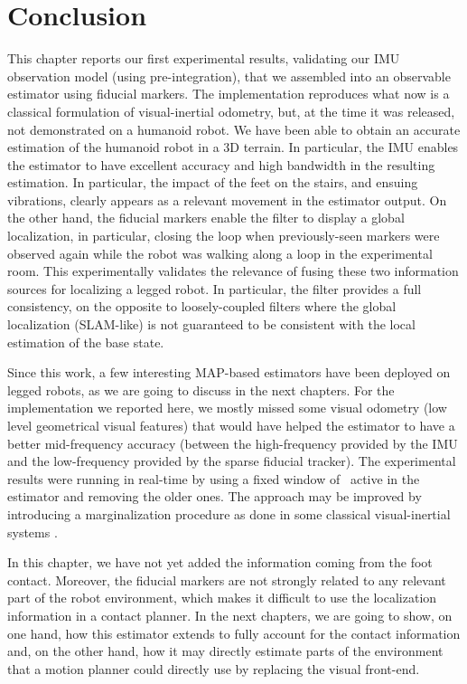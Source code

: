 \section{Conclusion}

This chapter reports our first experimental results, validating our IMU observation model (using pre-integration), that we assembled into an observable 
estimator using fiducial markers. The implementation reproduces what now is a classical formulation of visual-inertial odometry, but, at the time it was 
released, not demonstrated on a humanoid robot. We have been able to obtain an accurate estimation of the humanoid robot  in a 3D terrain. In particular, 
the IMU enables the estimator to have excellent accuracy and high bandwidth in the resulting estimation. In particular, the impact of the feet on the stairs, 
and ensuing vibrations, clearly appears as a relevant movement in the estimator output. On the other hand, the fiducial markers enable the filter to display 
a global localization, in particular, closing the loop when previously-seen markers were observed again while the 
robot was walking along a loop in the experimental room. This experimentally validates the relevance of fusing these two information sources for localizing a legged robot. In particular, the filter provides a full consistency, on the opposite to loosely-coupled 
filters where the global localization (SLAM-like) is not guaranteed to be consistent with the local estimation of the base state. 

Since this work, a few interesting MAP-based estimators have been deployed on legged robots, as we are going to discuss in the next chapters. 
For the implementation we reported here, we mostly missed some visual odometry (\ie low level geometrical visual features) that would have helped the estimator 
to have a better mid-frequency accuracy (between the high-frequency provided by the IMU and the low-frequency provided by the sparse fiducial tracker).
The experimental results were running in real-time by using a fixed window of \keyframes\ active in the estimator and removing the older ones. The
approach may be improved by introducing a marginalization procedure as done in some classical visual-inertial systems \cite{leutenegger2015keyframe}.

In this chapter, we have not yet added the information coming from the foot contact. Moreover, the fiducial markers are not strongly related to any 
relevant part of the robot environment, which makes it difficult to use the localization information in a contact planner. In the next chapters, we are going to show, on one hand,
how this estimator extends to fully account for the contact information and, on the other hand, how it may directly estimate parts of the environment that a motion planner could directly use by replacing
the visual front-end.